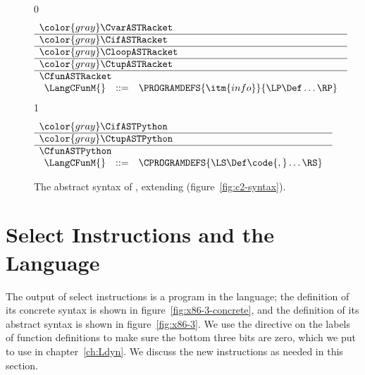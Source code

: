 \documentclass[7x10]{TimesAPriori_MIT}%
\newcommand{\gray}[1]{{\color{gray} #1}}
\def\racketEd{0}
\def\pythonEd{1}
\providecommand{\BookEdition}{1}
\let\edition\BookEdition
\newcommand{\pythonColor}[0]{}
\numberwithin{theorem}{chapter}
\numberwithin{definition}{chapter}
\numberwithin{equation}{chapter}
\begin{document}
\begin{figure}[tp]
  \begin{tcolorbox}[colback=white]
\footnotesize
{\if\edition\racketEd
\[
\begin{array}{l}
  \gray{\CvarASTRacket} \\ \hline
  \gray{\CifASTRacket} \\ \hline
  \gray{\CloopASTRacket} \\ \hline
  \gray{\CtupASTRacket} \\ \hline
  \CfunASTRacket \\
  \begin{array}{lcl}
  \LangCFunM{} & ::= & \PROGRAMDEFS{\itm{info}}{\LP\Def\ldots\RP} 
  \end{array}
\end{array}
\]
\fi}
{\if\edition\pythonEd\pythonColor
\[
  \begin{array}{l}
  \gray{\CifASTPython} \\ \hline
  \gray{\CtupASTPython} \\ \hline
  \CfunASTPython \\
  \begin{array}{lcl}
    \LangCFunM{} & ::= & \CPROGRAMDEFS{\LS\Def\code{,}\ldots\RS} 
  \end{array}
  \end{array}
\]
\fi}
  \end{tcolorbox}

\caption{The abstract syntax of \LangCFun{}, extending \LangCVec{} (figure~\ref{fig:c2-syntax}).}
\label{fig:c3-syntax}
\end{figure}

\clearpage

\section{Select Instructions and the \LangXIndCall{} Language}
\label{sec:select-r4}

The output of select instructions is a program in the \LangXIndCall{}
language; the definition of its concrete syntax is shown in
figure~\ref{fig:x86-3-concrete}, and the definition of its abstract
syntax is shown in figure~\ref{fig:x86-3}.  We use the 
directive on the labels of function definitions to make sure the
bottom three bits are zero, which we put to use in
chapter~\ref{ch:Ldyn}. We discuss the new instructions as needed in
this section.  
\end{document}
